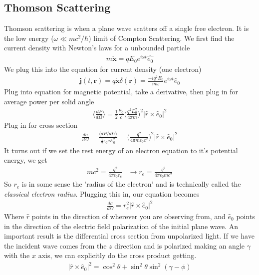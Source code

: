 \subsection{Thomson Scattering}
Thomson scattering is when a plane wave scatters off a single free electron. It is the low energy ($\omega \ll mc^2/\hbar$) limit of Compton Scattering. We first find the current density with Newton's laws for a unbounded particle
\begin{align}
    m\ddot{\textbf{x}} = qE_0e^{i\omega t}\hat{e_0}
\end{align}
We plug this into the equation for current density (one electron)
\begin{align}
    \textbf{j}(t,\textbf{r}) = q\dot{\textbf{x}}\delta(\textbf{r}) = \frac{-iq^2E_0}{m\omega}e^{i\omega t}\hat{e}_0
\end{align}
Plug into equation for magnetic potential, take a derivative, then plug in for average power per solid angle
\begin{align}
\Big\langle \frac{dP}{d\Omega}\Big\rangle = \frac{1}{2}\frac{\mu_0}{c}\Big(\frac{q^2E_0^2}{4\pi m}\Big)^2 |\hat{r}\times\hat{e}_0|^2
\end{align}
Plug in for cross section
\begin{align}
    \frac{d\sigma}{d\Omega} = \frac{\langle dP/d\Omega\rangle}{\frac{1}{2}\epsilon_0c E_0^2} = \Big(\frac{q^2}{4\pi m \epsilon_0 c^2} \Big)^2 | \hat{r}\times\hat{e}_0|^2
\end{align}
It turns out if we set the rest energy of an electron equation to it's potential energy, we get
\begin{align}
    mc^2 = \frac{q^2}{4\pi\epsilon_0 r_e} & \rightarrow r_e = \frac{q^2}{4\pi\epsilon_0mc^2}
\end{align}
So $r_e$ is in some sense the 'radius of the electron' and is technically called the \emph{classical electron radius}. Plugging this in, our equation becomes
\begin{align}
    \frac{d\sigma}{d\Omega}  = r_e^2|\hat{r}\times\hat{e}_0|^2
\end{align}
Where $\hat{r}$ points in the direction of wherever you are observing from, and $\hat{e}_0$ points in the direction of the electric field polarization of the initial plane wave. An important result is the differential cross section from unpolarized light. If we have the incident wave comes from the $z$ direction and is polarized making an angle $\gamma$ with the $x$ axis, we can explicitly do the cross product getting.
\begin{align}
    |\hat{r}\times\hat{e}_0|^2 = \cos^2\theta + \sin^2\theta\sin^2(\gamma-\phi)
\end{align}
